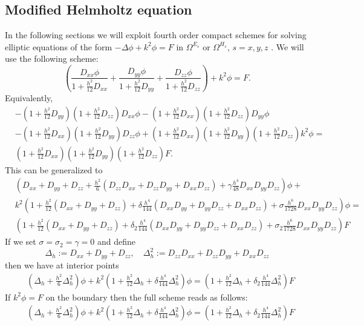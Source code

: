 \documentclass[12pt,reqno]{amsart}
\theoremstyle{definition}
\numberwithin{equation}{section}
\def\Gw{\Omega}     \def\Gx{\Xi}         \def\Gy{\Psi}
\begin{document}
   \subsection{Modified Helmholtz equation}
   In the following sections we will exploit fourth order compact schemes for solving elliptic equations of the form $-\Delta \phi+k^2\phi=F$ in $\Gw^{E_s}$ or $\Gw^{H_s}$, $s=x,y,z$ \cite{singer_turkel}.
   We will use the following scheme:
   $$
   \left (
   \frac{D_{xx}\phi}{1+\frac{h^2}{12}D_{xx}}+\frac{D_{yy}\phi}{1+\frac{h^2}{12}D_{yy}}
   +\frac{D_{zz}\phi}{1+\frac{h^2}{12}D_{zz}}\right)
   +k^2\phi=F.
   $$
   Equivalently,
   \begin{align*}
&
-\left(1+\frac{h^2}{12}D_{yy}\right)
\left(1+\frac{h^2}{12}D_{zz}\right)D_{xx}\phi-
\left(1+\frac{h^2}{12}D_{xx}\right)
\left(1+\frac{h^2}{12}D_{zz}\right)D_{yy}\phi\\&
-\left(1+\frac{h^2}{12}D_{xx}\right)
\left(1+\frac{h^2}{12}D_{yy}\right)D_{zz}\phi+
\left(1+\frac{h^2}{12}D_{xx}\right)
\left(1+\frac{h^2}{12}D_{yy}\right)
\left(1+\frac{h^2}{12}D_{zz}\right)k^2\phi
=\\&
\left(1+\frac{h^2}{12}D_{xx}\right)
\left(1+\frac{h^2}{12}D_{yy}\right)
\left(1+\frac{h^2}{12}D_{zz}\right)F.
\end{align*}
This can be generalized to 
\begin{align*}
	&
	\left (
	D_{xx}+D_{yy}+D_{zz}+\frac{h^2}{6}(D_{zz}D_{xx}+D_{zz}D_{yy}+D_{xx}D_{zz})
	+\gamma\frac{h^4}{48}D_{xx}D_{yy}D_{zz}
	\right)\phi+\\&
	k^2\left (
     1+\frac{h^2}{12}(D_{xx}+D_{yy}+D_{zz})	
     +\delta\frac{h^4}{144}(D_{xx}D_{yy}+D_{yy}D_{zz}+D_{xx}D_{zz})	
     +\sigma\frac{h^6}{1728}D_{xx}D_{yy}D_{zz}
	\right)\phi=\\&
		\left (
	1+\frac{h^2}{12}(D_{xx}+D_{yy}+D_{zz})	
	+\delta_2\frac{h^4}{144}(D_{xx}D_{yy}+D_{yy}D_{zz}+D_{xx}D_{zz})	
	+\sigma_2\frac{h^6}{1728}D_{xx}D_{yy}D_{zz}
	\right)F
\end{align*}
If we set $\sigma=\sigma_2=\gamma=0$ 
and define 
$$
\Delta_h:=D_{xx}+D_{yy}+D_{zz}, \quad \Delta^2_h:= D_{zz}D_{xx}+D_{zz}D_{yy}+D_{xx}D_{zz}
$$
then we have at interior points
\begin{align*}
	&
	\left (
	\Delta_h+\frac{h^2}{6}\Delta^2_h
	\right)\phi+
	k^2\left (
	1+\frac{h^2}{12}\Delta_h
	+\delta\frac{h^4}{144}\Delta^2_h
	\right)\phi=
	\left (
	1+\frac{h^2}{12}\Delta_h
	+\delta_2\frac{h^4}{144}\Delta^2_h
	\right)F
\end{align*}
If  $k^2\phi=F$ on the boundary then the full scheme 
reads as follows:
\begin{align*}
	&
	\left (
	\Delta_h+\frac{h^2}{6}\Delta^2_h
	\right)\phi+
	k^2\left (
	1+\frac{h^2}{12}\Delta_h
	+\delta\frac{h^4}{144}\Delta^2_h
	\right)\phi=
	\left (
	1+\frac{h^2}{12}\Delta_h
	+\delta_2\frac{h^4}{144}\Delta^2_h
	\right)F
\end{align*}
\end{document}
